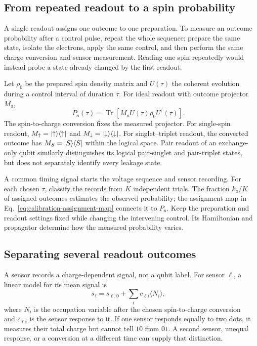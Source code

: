\subsection{From repeated readout to a spin probability}
\label{sec:measurement-pulse-cycle}

A single readout assigns one outcome to one preparation. To
measure an outcome probability after a control pulse, repeat the
whole sequence: prepare the same state, isolate the electrons,
apply the same control, and then perform the same charge conversion
and sensor measurement. Reading one spin repeatedly would instead
probe a state already changed by the first readout.

Let $\rho_0$ be the prepared spin density matrix and $U(\tau)$
the coherent evolution during a control interval of duration $\tau$.
For ideal readout with outcome projector $M_a$,
\begin{equation}
 P_a(\tau)=\operatorname{Tr}\!\left[
       M_a U(\tau)\rho_0U^\dagger(\tau)\right].
 \label{eq:measurement-pulse-born-rule}
\end{equation}
The spin-to-charge conversion fixes the measured projector.
For single-spin readout,
$M_\uparrow=\lvert \uparrow\rangle\langle \uparrow\rvert$ and
$M_\downarrow=\lvert \downarrow\rangle\langle \downarrow\rvert$.
For singlet--triplet readout, the converted outcome has
$M_S=\lvert S\rangle\langle S\rvert$ within the logical space.
Pair readout of an exchange-only qubit similarly distinguishes
its logical pair-singlet and pair-triplet states, but does not
separately identify every leakage state.

A common timing signal starts the voltage sequence and sensor
recording. For each chosen $\tau$, classify the records from
$K$ independent trials. The fraction $k_a/K$ of assigned outcomes
estimates the observed probability; the assignment map in
Eq.~\eqref{eq:calibration-assignment-map} connects it to $P_a$.
Keep the preparation and readout settings fixed while changing
the intervening control. Its Hamiltonian and propagator determine
how the measured probability varies.

\subsection{Separating several readout outcomes}
\label{sec:processor-array-readout}

A sensor records a charge-dependent signal, not a qubit label.
For sensor \(\ell\), a linear model for its mean signal is
\begin{equation}
 \overline s_\ell=s_{\ell,0}+\sum_i c_{\ell i}\langle N_i\rangle,
 \label{eq:processor-sensor-array}
\end{equation}
where \(N_i\) is the occupation variable after the chosen
spin-to-charge conversion and \(c_{\ell i}\) is the sensor
response to it. If one sensor responds equally to two dots,
it measures their total charge but cannot tell \(10\) from
\(01\). A second sensor, unequal response, or a conversion
at a different time can supply that distinction.

